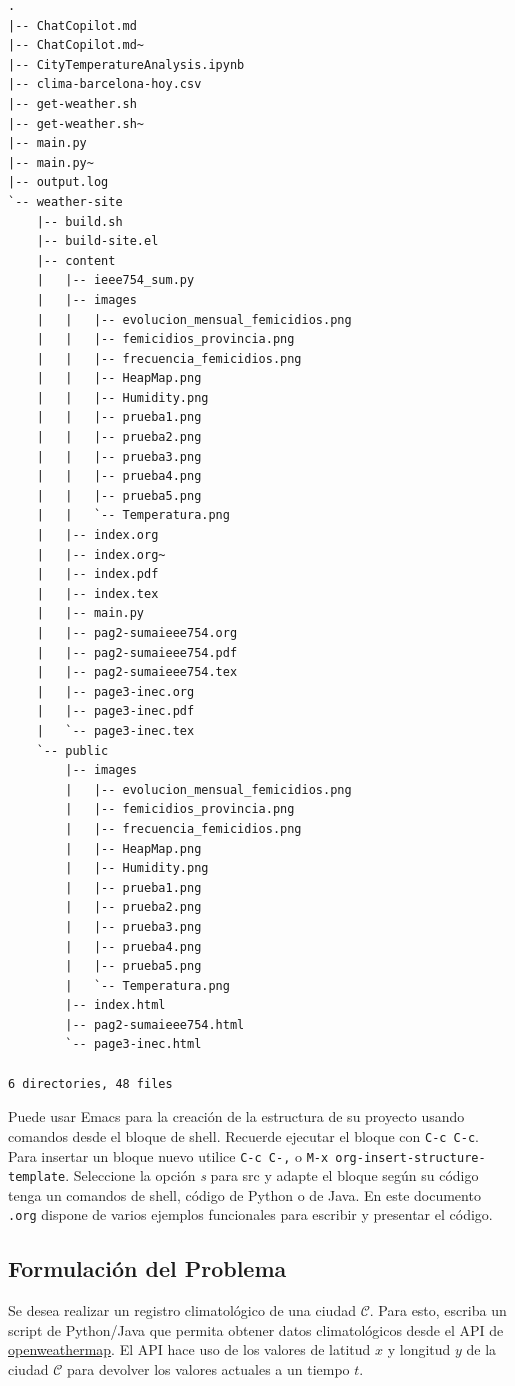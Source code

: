 \documentclass[11pt]{article}
\begin{document}
\label{orge6e2910}
\begin{verbatim}
.
|-- ChatCopilot.md
|-- ChatCopilot.md~
|-- CityTemperatureAnalysis.ipynb
|-- clima-barcelona-hoy.csv
|-- get-weather.sh
|-- get-weather.sh~
|-- main.py
|-- main.py~
|-- output.log
`-- weather-site
    |-- build.sh
    |-- build-site.el
    |-- content
    |   |-- ieee754_sum.py
    |   |-- images
    |   |   |-- evolucion_mensual_femicidios.png
    |   |   |-- femicidios_provincia.png
    |   |   |-- frecuencia_femicidios.png
    |   |   |-- HeapMap.png
    |   |   |-- Humidity.png
    |   |   |-- prueba1.png
    |   |   |-- prueba2.png
    |   |   |-- prueba3.png
    |   |   |-- prueba4.png
    |   |   |-- prueba5.png
    |   |   `-- Temperatura.png
    |   |-- index.org
    |   |-- index.org~
    |   |-- index.pdf
    |   |-- index.tex
    |   |-- main.py
    |   |-- pag2-sumaieee754.org
    |   |-- pag2-sumaieee754.pdf
    |   |-- pag2-sumaieee754.tex
    |   |-- page3-inec.org
    |   |-- page3-inec.pdf
    |   `-- page3-inec.tex
    `-- public
        |-- images
        |   |-- evolucion_mensual_femicidios.png
        |   |-- femicidios_provincia.png
        |   |-- frecuencia_femicidios.png
        |   |-- HeapMap.png
        |   |-- Humidity.png
        |   |-- prueba1.png
        |   |-- prueba2.png
        |   |-- prueba3.png
        |   |-- prueba4.png
        |   |-- prueba5.png
        |   `-- Temperatura.png
        |-- index.html
        |-- pag2-sumaieee754.html
        `-- page3-inec.html

6 directories, 48 files
\end{verbatim}

Puede usar Emacs para la creación de la estructura de su proyecto
usando comandos desde el bloque de shell. Recuerde ejecutar el bloque
con \texttt{C-c C-c}. Para insertar un bloque nuevo utilice \texttt{C-c C-,} o \texttt{M-x
org-insert-structure-template}. Seleccione la opción \emph{s} para src y
adapte el bloque según su código tenga un comandos de shell, código de
Python o de Java. En este documento \texttt{.org} dispone de varios ejemplos
funcionales para escribir y presentar el código.
\subsection{Formulación del Problema}
\label{sec:org96ef49d}
Se desea realizar un registro climatológico de una ciudad
\(\mathcal{C}\). Para esto, escriba un script de Python/Java que permita
obtener datos climatológicos desde el API de \href{https://openweathermap.org/current\#one}{openweathermap}. El API
hace uso de los valores de latitud \(x\) y longitud \(y\) de la ciudad
\(\mathcal{C}\) para devolver los valores actuales a un tiempo \(t\).
\end{document}

